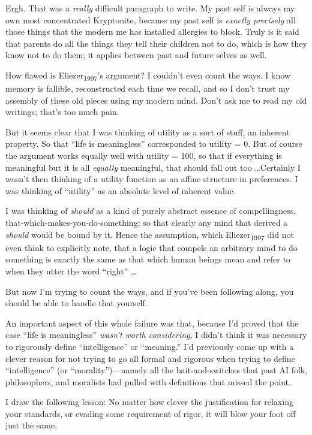 {
 Ergh. That was a \textit{really} difficult paragraph to write. My
past self is always my own most concentrated Kryptonite, because my
past self is \textit{exactly precisely} all those things that the
modern me has installed allergies to block. Truly is it said that
parents do all the things they tell their children not to do, which is
how they know not to do them; it applies between past and future selves
as well.}

{
 How flawed is Eliezer\textsubscript{1997}'s
argument? I couldn't even count the ways. I know memory
is fallible, reconstructed each time we recall, and so I
don't trust my assembly of these old pieces using my
modern mind. Don't ask me to read my old writings;
that's too much pain.}

{
 But it seems clear that I was thinking of utility as a sort of
stuff, an inherent property. So that ``life is
meaningless'' corresponded to utility = 0. But of
course the argument works equally well with utility = 100, so that if
everything is meaningful but it is all \textit{equally} meaningful,
that should fall out too \ldots Certainly I wasn't then
thinking of a utility function as an affine structure in preferences. I
was thinking of ``utility'' as an
absolute level of inherent value.}

{
 I was thinking of \textit{should} as a kind of purely abstract
essence of compellingness, that-which-makes-you-do-something; so that
clearly any mind that derived a \textit{should} would be bound by it.
Hence the assumption, which Eliezer\textsubscript{1997} did not even
think to explicitly note, that a logic that compels an arbitrary mind
to do something is exactly the same as that which human beings mean and
refer to when they utter the word
``right'' \ldots}

{
 But now I'm trying to count the ways, and if
you've been following along, you should be able to
handle that yourself.}

{
 An important aspect of this whole failure was that, because
I'd proved that the case ``life is
meaningless'' \textit{wasn't worth
considering}, I didn't think it was necessary to
rigorously define ``intelligence''
or ``meaning.'' I'd
previously come up with a clever reason for not trying to go all formal
and rigorous when trying to define
``intelligence'' (or
``morality'')---namely all the
bait-and-switches that past AI folk, philosophers, and moralists had
pulled with definitions that missed the point.}

{
 I draw the following lesson: No matter how clever the
justification for relaxing your standards, or evading some requirement
of rigor, it will blow your foot off just the same.}


